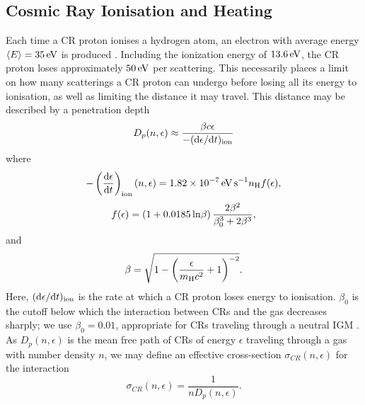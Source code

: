 \documentclass[usenatbib]{mn2e}
\newcommand{\ev}{\,{\rm eV}}
\newcommand{\h}{\mathrm{H}}
\begin{document}
\subsection{Cosmic Ray Ionisation and Heating}
\label{CRchem}

Each time a CR proton ionises a hydrogen atom, an electron with average energy $\langle E \rangle = 35\ev$ is produced \citep{SpitzerTomasko1968}.  
Including the ionization energy of $13.6\ev$, the CR proton loses approximately $50\ev$ per scattering. 
This necessarily places a limit on how many scatterings a CR proton can undergo before losing all its energy to ionisation, as well as limiting the distance it may travel.  
This distance may be described by a penetration depth 
\begin{equation}
    D_p(n, \epsilon) \approx \frac{\beta c \epsilon} {-({\rm d}\epsilon / {\rm d}t)_{\rm ion}}
\end{equation}
where \citep{Schlickeiser2002}
\begin{equation}
    - \left( \frac{{\rm d}\epsilon} {{\rm d}t} \right)_{\rm ion}(n, \epsilon)
    = 1.82\times10^{-7}\,{\rm \small eV\,s}^{-1} n_{\h} f(\epsilon),
\end{equation}
\begin{equation}    
    f(\epsilon) = (1 + 0.0185 \,{\rm ln}\beta )\, \frac{2 \beta^2}{\beta_0^3 + 2 \beta^3},
\end{equation}
and 
\begin{equation}
    \beta =  \sqrt{1 - \left( \frac{\epsilon}{m_{\rm \tiny H}c^2}+1 \right)^{-2}}.
\end{equation}
Here, $({\rm d}\epsilon / {\rm d}t)_{\rm ion}$ is the rate at which a CR proton loses energy to ionisation. 
$\beta_0$ is the cutoff below which the interaction between CRs and the gas decreases sharply; we use $\beta_0=0.01$, appropriate for CRs traveling through a neutral IGM \citep{StacyBromm2007}.
As $D_p(n, \epsilon)$ is the mean free path of CRs of energy $\epsilon$ traveling through a gas with number density $n$, we may define an effective cross-section $\sigma_{CR}(n,\epsilon)$ for the interaction
\begin{equation}
\sigma_{CR}(n,\epsilon) = \frac{1}{n D_p(n, \epsilon)}.
\end{equation}
\end{document}
